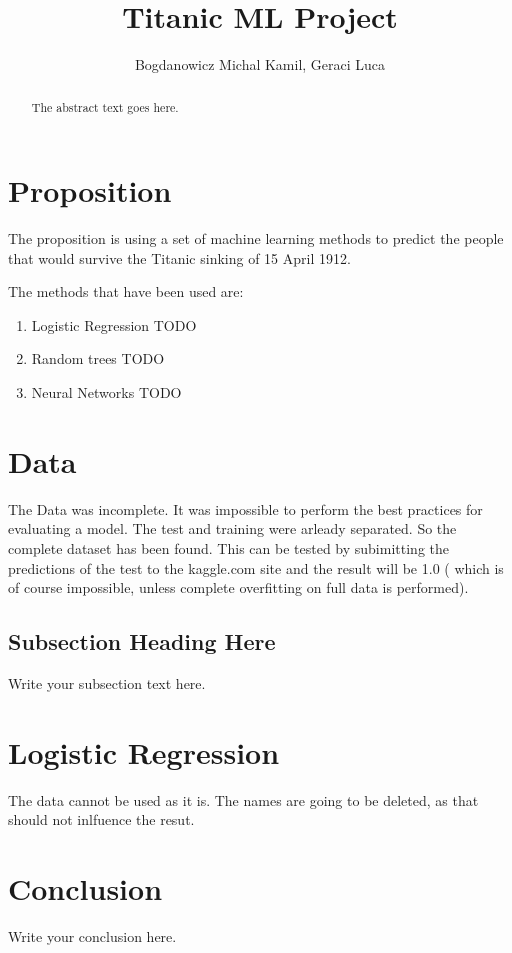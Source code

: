 \documentclass{article}
\begin{document}
\title{Titanic ML Project}
\author{Bogdanowicz Michal Kamil, Geraci Luca}

\maketitle

\begin{abstract}
The abstract text goes here.
\end{abstract}


\section{Proposition}
The proposition is using a set of machine learning methods to predict the people that would survive the Titanic sinking of 15 April 1912.

The methods that have been used are:

\begin{enumerate}  
\item Logistic Regression TODO
\item Random trees TODO
\item Neural Networks TODO
\end{enumerate}

\section{Data}

The Data was incomplete. It was impossible to perform the best practices for evaluating a model. The test and training were arleady separated. So the complete dataset has been found. This can be tested by subimitting the predictions of the test to the kaggle.com site and the result will be 1.0 ( which is of course impossible, unless complete overfitting on full data is performed).



\subsection{Subsection Heading Here}
Write your subsection text here.

\section{Logistic Regression}
The data cannot be used as it is.
The names are going to be deleted, as that should not inlfuence the resut.


\section{Conclusion}
Write your conclusion here.
\end{document}

